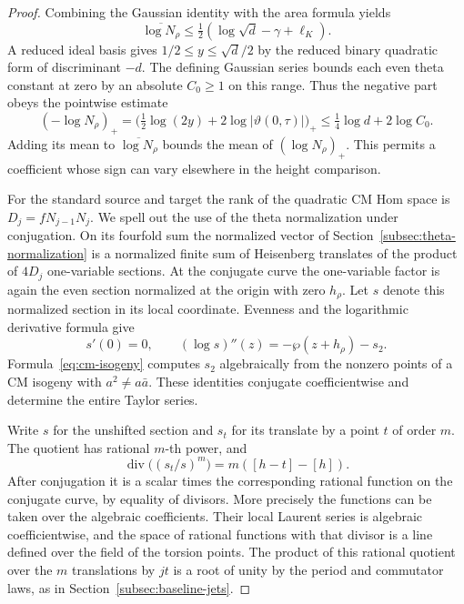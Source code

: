 \begin{proof}
Combining the Gaussian identity with the area formula yields
\[
        \overline{\log N_\rho}
        \le\tfrac12(\log\sqrt d-\gamma+\ell_K).
\]
A reduced ideal basis gives \(1/2\le y\le\sqrt d/2\)
by the reduced binary quadratic form of discriminant \(-d\).
The defining Gaussian series bounds each even theta constant
at zero by an absolute \(C_0\ge1\) on this range. Thus the negative part obeys the pointwise estimate
\[
 (-\log N_\rho)_+
 =\big(\tfrac12\log(2y)+2\log|\vartheta(0,\tau)|\big)_+
 \le \tfrac14\log d+2\log C_0 .
\]
Adding its mean to \(\overline{\log N_\rho}\) bounds the mean
of \((\log N_\rho)_+\). This permits a coefficient whose
sign can vary elsewhere in the height comparison.
\cite{elliptic-constants}\label{cor:selected-period-means-2}


For the standard source and target the rank of the quadratic
CM Hom space is \(D_j=f N_{j-1}N_j\). We spell out the use of
the theta normalization under conjugation. On its fourfold sum
the normalized vector of Section~\ref{subsec:theta-normalization}
is a normalized finite sum of Heisenberg translates of the
product of \(4D_j\) one-variable sections. At the conjugate
curve the one-variable factor is again the even section
normalized at the origin with zero \(h_\rho\). Let \(s\) denote this normalized section in its local coordinate. Evenness and the logarithmic derivative formula give
\[
 s'(0)=0,\qquad (\log s)''(z)=-\wp(z+h_\rho)-s_2 .
\]
Formula~\eqref{eq:cm-isogeny} computes \(s_2\) algebraically from the nonzero points of a CM isogeny with \(a^2\ne a\bar a\). These identities conjugate
coefficientwise and determine the entire Taylor series.


Write \(s\) for the unshifted section and \(s_t\) for its
translate by a point \(t\) of order \(m\). The quotient has rational
\(m\)-th power, and
\[
            \operatorname{div}\bigl((s_t/s)^m\bigr)
                      =m([h-t]-[h]).
\] After conjugation it is a scalar times the
corresponding rational function on the conjugate curve, by
equality of divisors. More precisely the functions can be taken
over the algebraic coefficients. Their local Laurent series is
algebraic coefficientwise, and the space of rational functions
with that divisor is a line defined over the field of the torsion
points. The product of this rational quotient over the \(m\)
translations by \(jt\) is a root of unity by the period and
commutator laws, as in Section~\ref{subsec:baseline-jets}.


\end{proof}
